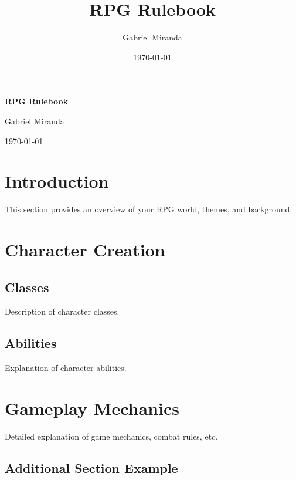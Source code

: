 \documentclass[twocolumn,12pt]{article}  %
\title{RPG Rulebook}
\author{Gabriel Miranda}
\date{\today}
\newcommand{\coverpage}{
    \begin{titlepage}
        \centering
        \vspace*{5cm}
        {\Huge\bfseries RPG Rulebook\par}
        \vspace{1cm}
        {\LARGE Gabriel Miranda\par}
        \vfill
        {\Large \today\par}
    \end{titlepage}
}
\begin{document}
\coverpage

\maketitle

\clearpage
\tableofcontents
\clearpage

\section{Introduction}
This section provides an overview of your RPG world, themes, and background.

\section{Character Creation}
\subsection{Classes}
Description of character classes.

\subsection{Abilities}
Explanation of character abilities.

\section{Gameplay Mechanics}
Detailed explanation of game mechanics, combat rules, etc.

\begin{multicols}{2}
\section{Additional Section Example}
\lipsum[1-3]  %
\end{multicols}
\end{document}
